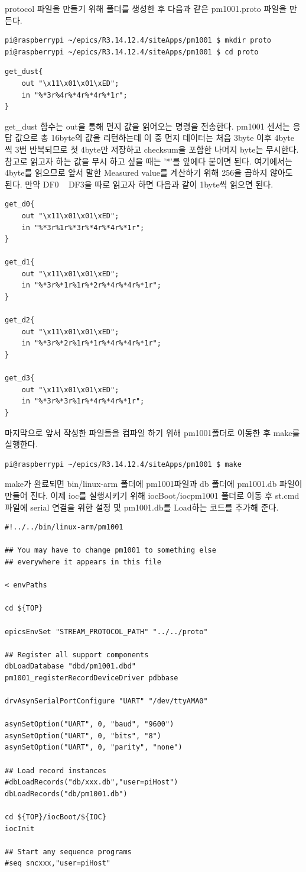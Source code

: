 \documentclass[11pt
  , a4paper
  , article
  , oneside
]{memoir}
\begin{document}
protocol 파일을 만들기 위해 폴더를 생성한 후 다음과 같은 pm1001.proto 파일을 만든다.
\begin{lstlisting}[style=termstyle]
pi@raspberrypi ~/epics/R3.14.12.4/siteApps/pm1001 $ mkdir proto
pi@raspberrypi ~/epics/R3.14.12.4/siteApps/pm1001 $ cd proto
\end{lstlisting}
\begin{lstlisting}[style=termstyle]
get_dust{
	out "\x11\x01\x01\xED";
	in "%*3r%4r%*4r%*4r%*1r";
}
\end{lstlisting}
get\_dust 함수는 out을 통해 먼지 값을 읽어오는 명령을 전송한다. pm1001 센서는 응답 값으로 총 16byte의 
값을 리턴하는데 이 중 먼지 데이터는 처음 3byte 이후 4byte 씩 3번 반복되므로 첫 4byte만 저장하고 
checksum을 포함한 나머지 byte는 무시한다. 참고로 읽고자 하는 값을 무시 하고 싶을 때는 '*'를 앞에다
붙이면 된다. 여기에서는 4byte를 읽으므로 앞서 말한 Measured value를 계산하기 위해 256을 곱하지 않아도 
된다. 만약 DF0 ~ DF3을 따로 읽고자 하면 다음과 같이 1byte씩 읽으면 된다. 
\begin{lstlisting}[style=termstyle]
get_d0{
	out "\x11\x01\x01\xED";
	in "%*3r%1r%*3r%*4r%*4r%*1r";
}

get_d1{
	out "\x11\x01\x01\xED";
	in "%*3r%*1r%1r%*2r%*4r%*4r%*1r";
}

get_d2{
	out "\x11\x01\x01\xED";
	in "%*3r%*2r%1r%*1r%*4r%*4r%*1r";
}

get_d3{
	out "\x11\x01\x01\xED";
	in "%*3r%*3r%1r%*4r%*4r%*1r";
}
\end{lstlisting}
마지막으로 앞서 작성한 파일들을 컴파일 하기 위해 pm1001폴더로 이동한 후 make를 실행한다.
\begin{lstlisting}[style=termstyle]
pi@raspberrypi ~/epics/R3.14.12.4/siteApps/pm1001 $ make
\end{lstlisting}
make가 완료되면 bin/linux-arm 폴더에 pm1001파일과 db 폴더에 pm1001.db 파일이 만들어 진다.
이제 ioc를 실행시키기 위해 iocBoot/iocpm1001 폴더로 이동 후 st.cmd파일에 serial 연결을 위한
설정 및 pm1001.db를 Load하는 코드를 추가해 준다.
\begin{lstlisting}[style=termstyle]
#!../../bin/linux-arm/pm1001

## You may have to change pm1001 to something else
## everywhere it appears in this file

< envPaths

cd ${TOP}

epicsEnvSet "STREAM_PROTOCOL_PATH" "../../proto"

## Register all support components
dbLoadDatabase "dbd/pm1001.dbd"
pm1001_registerRecordDeviceDriver pdbbase

drvAsynSerialPortConfigure "UART" "/dev/ttyAMA0"

asynSetOption("UART", 0, "baud", "9600")
asynSetOption("UART", 0, "bits", "8")
asynSetOption("UART", 0, "parity", "none")

## Load record instances
#dbLoadRecords("db/xxx.db","user=piHost")
dbLoadRecords("db/pm1001.db")

cd ${TOP}/iocBoot/${IOC}
iocInit

## Start any sequence programs
#seq sncxxx,"user=piHost"
\end{lstlisting}
\end{document}
